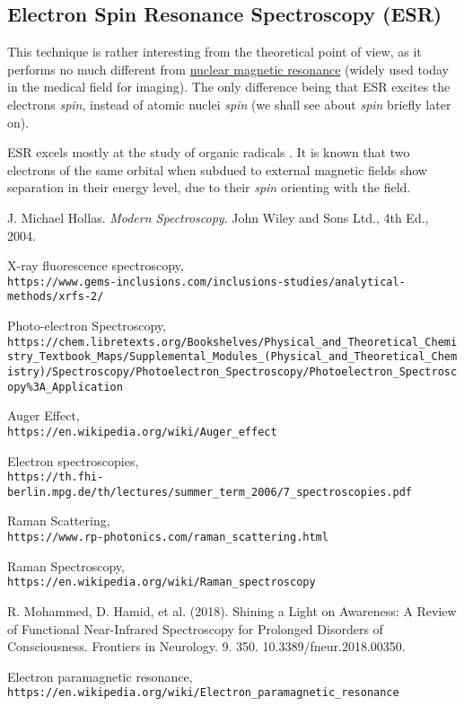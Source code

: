 \documentclass[]{report}
\begin{document}
\subsection{Electron Spin Resonance Spectroscopy (ESR)} \label{ESR} %
This technique is rather interesting from the theoretical point of view, as it performs no much different from \href{https://en.wikipedia.org/wiki/Nuclear_magnetic_resonance}{nuclear magnetic resonance} (widely used today in the medical field for imaging). The only difference being that ESR excites the electrons \textit{spin}, instead of atomic nuclei \textit{spin} (we shall see about \textit{spin} briefly later on).
\par ESR excels mostly at the study of organic radicals \cite{ESR_Wiki}. It is known that two electrons of the same orbital when subdued to external magnetic fields show separation in their energy level, due to their \textit{spin} orienting with the field.

\newpage

\begin{thebibliography}{9}
J. Michael Hollas. 
\textit{Modern Spectroscopy}. 
John Wiley and Sons Ltd., 4th Ed., 2004.

X-ray fluorescence spectroscopy,
\\\texttt{https://www.gems-inclusions.com/inclusions-studies/analytical-methods/xrfs-2/}

Photo-electron Spectroscopy,
\\\texttt{https://chem.libretexts.org/Bookshelves/Physical\_and\_Theoretical\_Chemistry\_Textbook\_Maps/Supplemental\_Modules\_(Physical\_and\_Theoretical\_Chemistry)/Spectroscopy/Photoelectron\_Spectroscopy/Photoelectron\_Spectroscopy\%3A\_Application}

Auger Effect,
\\\texttt{https://en.wikipedia.org/wiki/Auger\_effect}

Electron spectroscopies,
\\\texttt{https://th.fhi-berlin.mpg.de/th/lectures/summer\_term\_2006/7\_spectroscopies.pdf}

Raman Scattering,
\\\texttt{https://www.rp-photonics.com/raman\_scattering.html}

Raman Spectroscopy,
\\\texttt{https://en.wikipedia.org/wiki/Raman\_spectroscopy}

R. Mohammed, D. Hamid, et al. (2018).
Shining a Light on Awareness: A Review of Functional Near-Infrared Spectroscopy for Prolonged Disorders of Consciousness.
Frontiers in Neurology. 9. 350. 10.3389/fneur.2018.00350.

Electron paramagnetic resonance,
\\\texttt{https://en.wikipedia.org/wiki/Electron\_paramagnetic\_resonance}

\end{thebibliography}
\end{document}
